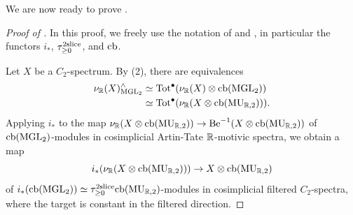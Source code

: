 We are now ready to prove .
%
%
\begin{proof}[Proof of ]
  In this proof, we freely use the notation of  and , in particular the functors $i_*$, $\tau_{\geq 0} ^{2\mathrm{slice}}$, and $\mathrm{cb}$.

  Let $X$ be a $C_2$-spectrum. By (2), there are equivalences
  \begin{align*}
    \nu_{\mathbb{R}}(X)^{\wedge} _{\mathrm{MGL}_2}
    &\simeq \mathrm{Tot}^{\bullet} (\nu_{\mathbb{R}}(X) \otimes \mathrm{cb}(\mathrm{MGL}_2)) \\
    &\simeq \mathrm{Tot}^{\bullet} (\nu_{\mathbb{R}}(X \otimes \mathrm{cb}(\operatorname{\mathrm{MU}}_{\mathbb{R}, 2}))).
  \end{align*}
  Applying $i_*$ to the map $\nu_{\mathbb{R}}(X \otimes \mathrm{cb}(\operatorname{\mathrm{MU}}_{\mathbb{R}, 2})) \to \mathrm{Be}^{-1} (X \otimes \mathrm{cb}(\operatorname{\mathrm{MU}}_{\mathbb{R}, 2}))$ of $\mathrm{cb}(\mathrm{MGL}_2)$-modules in cosimplicial Artin-Tate $\mathbb{R}$-motivic spectra, we obtain a map
  \[i_* (\nu_{\mathbb{R}} (X \otimes \mathrm{cb}(\operatorname{\mathrm{MU}}_{\mathbb{R}, 2}))) \to X \otimes \mathrm{cb}(\operatorname{\mathrm{MU}}_{\mathbb{R}, 2})\]
  of $i_* (\mathrm{cb}(\mathrm{MGL}_2)) \simeq \tau_{\geq 0}^{2\mathrm{slice}} \mathrm{cb}(\operatorname{\mathrm{MU}}_{\mathbb{R}, 2})$-modules in cosimplicial filtered $C_2$-spectra, where the target is constant in the filtered direction.


\end{proof}
